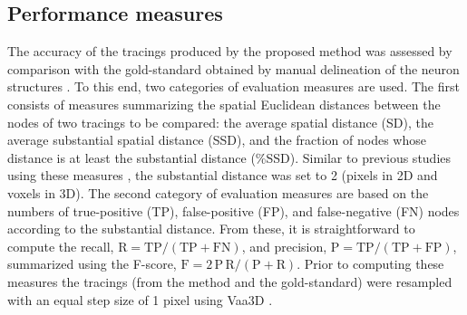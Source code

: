 \subsection{Performance measures}
\label{subsec:performance-measures}
The accuracy of the tracings produced by the proposed method was assessed by comparison with the gold-standard obtained by manual delineation of the neuron structures \cite{gillette2011diademchallenge, meijering2004design}. To this end, two categories of evaluation measures are used. The first consists of measures summarizing the spatial Euclidean distances between the nodes of two tracings to be compared: the average spatial distance (SD), the average substantial spatial distance (SSD), and the fraction of nodes whose distance is at least the substantial distance (\%SSD). Similar to previous studies using these measures \cite{peng2010v3d}, the substantial distance was set to 2 (pixels in 2D and voxels in 3D). The second category of evaluation measures are based on the numbers of true-positive (TP), false-positive (FP), and false-negative (FN) nodes according to the substantial distance. From these, it is straightforward to compute the recall, $\textrm{R}=\textrm{TP}/(\textrm{TP}+\textrm{FN})$, and precision, $\textrm{P}=\textrm{TP}/(\textrm{TP}+\textrm{FP})$, summarized using the F-score, $\textrm{F}=2\,\textrm{P}\,\textrm{R}/(\textrm{P}+\textrm{R})$. Prior to computing these measures the tracings (from the method and the gold-standard) were resampled with an equal step size of 1 pixel using Vaa3D \cite{peng2010v3d}.

